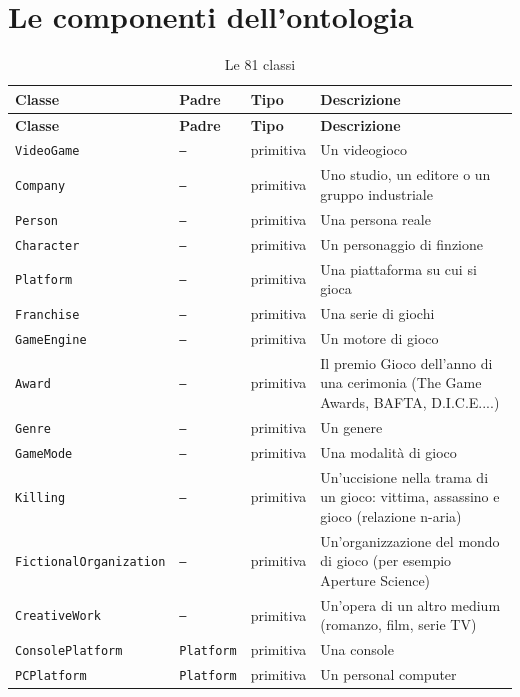 \section{Le componenti dell'ontologia}\label{app:componenti}

\begingroup\footnotesize\begin{longtable}{lllp{5.8cm}}
\caption{Le 81 classi}\\ \toprule
\textbf{Classe} & \textbf{Padre} & \textbf{Tipo} & \textbf{Descrizione} \\ \midrule \endfirsthead
\textbf{Classe} & \textbf{Padre} & \textbf{Tipo} & \textbf{Descrizione} \\ \midrule \endhead \bottomrule \endfoot
\texttt{VideoGame} & \texttt{--} & primitiva & Un videogioco \\
\texttt{Company} & \texttt{--} & primitiva & Uno studio, un editore o un gruppo industriale \\
\texttt{Person} & \texttt{--} & primitiva & Una persona reale \\
\texttt{Character} & \texttt{--} & primitiva & Un personaggio di finzione \\
\texttt{Platform} & \texttt{--} & primitiva & Una piattaforma su cui si gioca \\
\texttt{Franchise} & \texttt{--} & primitiva & Una serie di giochi \\
\texttt{GameEngine} & \texttt{--} & primitiva & Un motore di gioco \\
\texttt{Award} & \texttt{--} & primitiva & Il premio Gioco dell'anno di una cerimonia (The Game Awards, BAFTA, D.I.C.E....) \\
\texttt{Genre} & \texttt{--} & primitiva & Un genere \\
\texttt{GameMode} & \texttt{--} & primitiva & Una modalità di gioco \\
\texttt{Killing} & \texttt{--} & primitiva & Un'uccisione nella trama di un gioco: vittima, assassino e gioco (relazione n-aria) \\
\texttt{FictionalOrganization} & \texttt{--} & primitiva & Un'organizzazione del mondo di gioco (per esempio Aperture Science) \\
\texttt{CreativeWork} & \texttt{--} & primitiva & Un'opera di un altro medium (romanzo, film, serie TV) \\
\texttt{ConsolePlatform} & \texttt{Platform} & primitiva & Una console \\
\texttt{PCPlatform} & \texttt{Platform} & primitiva & Un personal computer \\

\end{longtable}
